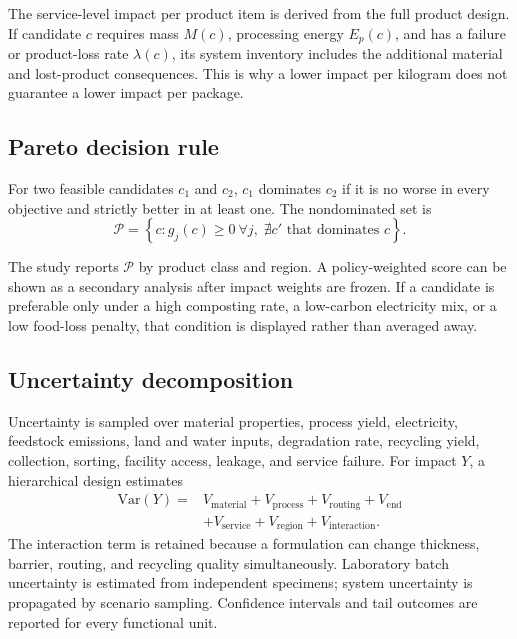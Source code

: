 \documentclass[conference]{IEEEtran}
\begin{document}
The service-level impact per product item is derived from the full product design. If candidate $c$ requires mass $M(c)$, processing energy $E_p(c)$, and has a failure or product-loss rate $\lambda(c)$, its system inventory includes the additional material and lost-product consequences. This is why a lower impact per kilogram does not guarantee a lower impact per package.

\subsection{Pareto decision rule}

For two feasible candidates $c_1$ and $c_2$, $c_1$ dominates $c_2$ if it is no worse in every objective and strictly better in at least one. The nondominated set is
\begin{equation}
 \mathcal{P}=\left\{c:g_j(c)\geq0\ \forall j,\; \nexists c'\text{ that dominates }c\right\}.
 \label{eq:pareto}
\end{equation}

The study reports $\mathcal{P}$ by product class and region. A policy-weighted score can be shown as a secondary analysis after impact weights are frozen. If a candidate is preferable only under a high composting rate, a low-carbon electricity mix, or a low food-loss penalty, that condition is displayed rather than averaged away.

\subsection{Uncertainty decomposition}

Uncertainty is sampled over material properties, process yield, electricity, feedstock emissions, land and water inputs, degradation rate, recycling yield, collection, sorting, facility access, leakage, and service failure. For impact $Y$, a hierarchical design estimates
\begin{equation}
 \begin{aligned}
 \mathrm{Var}(Y)={}&V_{\mathrm{material}}+V_{\mathrm{process}}+V_{\mathrm{routing}}+V_{\mathrm{end}}\\
 &+V_{\mathrm{service}}+V_{\mathrm{region}}+V_{\mathrm{interaction}}.
 \end{aligned}
 \label{eq:uncertainty}
\end{equation}
The interaction term is retained because a formulation can change thickness, barrier, routing, and recycling quality simultaneously. Laboratory batch uncertainty is estimated from independent specimens; system uncertainty is propagated by scenario sampling. Confidence intervals and tail outcomes are reported for every functional unit.
\end{document}

